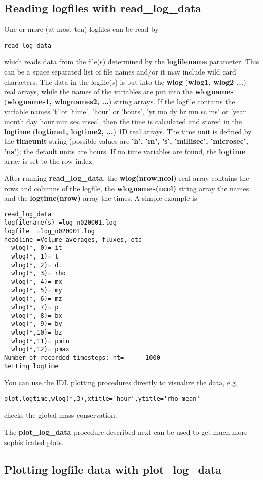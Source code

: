 \documentclass{article}
\begin{document}
\subsection{Reading logfiles with read\_log\_data \label{s-getlog}}

One or more (at most ten) logfiles can be read by
\begin{verbatim}
read_log_data
\end{verbatim}
which reads data from the file(s) determined by the {\bf logfilename} 
parameter. This can be a space separated list of file names and/or it
may include wild card characters. The data in the
logfile(s) is put into the {\bf wlog} ({\bf wlog1, wlog2 ...}) real arrays,
while the names of the variables are put into the {\bf wlognames} 
({\bf wlognames1, wlognames2, ...}) string arrays. If the logfile contains
the variable names 't' or 'time', 'hour' or 'hours',
'yr mo dy hr mn sc ms' or 'year month day hour min sec msec', 
then the time is calculated and stored in the {\bf logtime} 
({\bf logtime1, logtime2, ...}) 1D real arrays. 
The time unit is defined by the {\bf timeunit} string
(possible values are {\bf 'h', 'm', 's', 'millisec', 'microsec', 'ns'});
the default units are hours. 
If no time variables are found, the {\bf logtime} array is set to the
row index.

After running {\bf read\_log\_data}, the {\bf wlog(nrow,ncol)} real array 
contains the rows and columns of the logfile, 
the {\bf wlognames(ncol)} string array the names and the
{\bf logtime(nrow)} array the times. A simple example is 
\begin{verbatim}
read_log_data
logfilename(s) =log_n020001.log
logfile  =log_n020001.log
headline =Volume averages, fluxes, etc
  wlog(*, 0)= it
  wlog(*, 1)= t
  wlog(*, 2)= dt
  wlog(*, 3)= rho
  wlog(*, 4)= mx
  wlog(*, 5)= my
  wlog(*, 6)= mz
  wlog(*, 7)= p
  wlog(*, 8)= bx
  wlog(*, 9)= by
  wlog(*,10)= bz
  wlog(*,11)= pmin
  wlog(*,12)= pmax
Number of recorded timesteps: nt=      1000
Setting logtime
\end{verbatim}
You can use the IDL plotting procedures directly to visualize the data, e.g.
\begin{verbatim}
plot,logtime,wlog(*,3),xtitle='hour',ytitle='rho_mean'
\end{verbatim}
checks the global mass conservation. 

The {\bf plot\_log\_data} procedure described next can be used to get 
much more sophisticated plots. 

\subsection{Plotting logfile data with plot\_log\_data \label{s-plotlog}}
\end{document}
